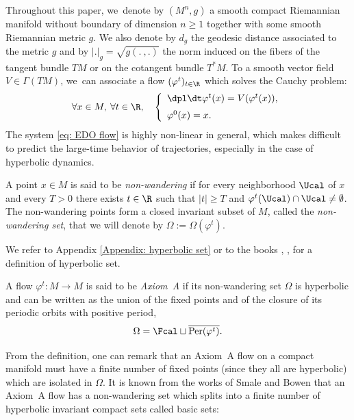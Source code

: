 Throughout this paper, we~denote by $(M^n,g)$ a smooth compact Riemannian manifold without boundary of dimension $n\geq 1$ together with some smooth Riemannian metric $g$. We also denote by $d_g$ the geodesic distance associated to the metric $g$ and by $|.|_g = \sqrt{g(. \:,.)}$ the norm induced on the fibers of the tangent bundle $TM$ or on the cotangent bundle $T^*M$. To a smooth vector field $V \in \Gamma (TM)$, we~can associate a flow $(\varphi^t)_{t \in \R}$ which solves the Cauchy problem:
\begin{equation}\label{eq: EDO flow}
\forall x \in M, \: \forall t \in \R, \quad
\left\{
\begin{array}{ll}
\dpl\dt \varphi^t (x) = V (\varphi^t (x)), \\[6pt]
\varphi^0 (x) = x.
\end{array}
\right.
\end{equation}
The system \eqref{eq: EDO flow} is highly non-linear in general, which makes difficult to predict the large-time behavior of trajectories, especially in the case of hyperbolic dynamics.

\begin{definition}
A point $x \in M$ is said to be \emph{non-wandering} if for every neighborhood $\Ucal$ of $x$ and every $T > 0$ there exists $t \in \R$ such that $|t| \geq T$ and $\varphi^t (\Ucal) \cap \Ucal \neq \emptyset$. The non-wandering points form a closed invariant subset of $M$, called the \emph{non-wandering set}, that we will denote by $\Omega:= \Omega (\varphi^t)$.
\end{definition}

We refer to Appendix \ref{Appendix: hyperbolic set} or to the books \cite{palis-demelo}, \cite{katok-hasselblatt}, \cite{FH} for a definition of hyperbolic set.

\begin{definition}
A flow $\varphi^t: M \to M$ is said to be \emph{Axiom~A} if its non-wandering set $\Omega$ is hyperbolic and can be written as the union of the fixed points and of the closure of its periodic orbits with positive period, \ie\vspace*{-3pt}
\[
\Omega = \Fcal \sqcup \overline{\mathrm{Per} (\varphi^t)}.
\]
\end{definition}

From the definition, one can remark that an Axiom~A flow on a compact manifold must have a finite number of fixed points (since they all are hyperbolic) which are isolated in $\Omega$. It is known from the works of Smale and Bowen that an Axiom~A flow has a non-wandering set which splits into a finite number of hyperbolic invariant compact sets called basic sets:

